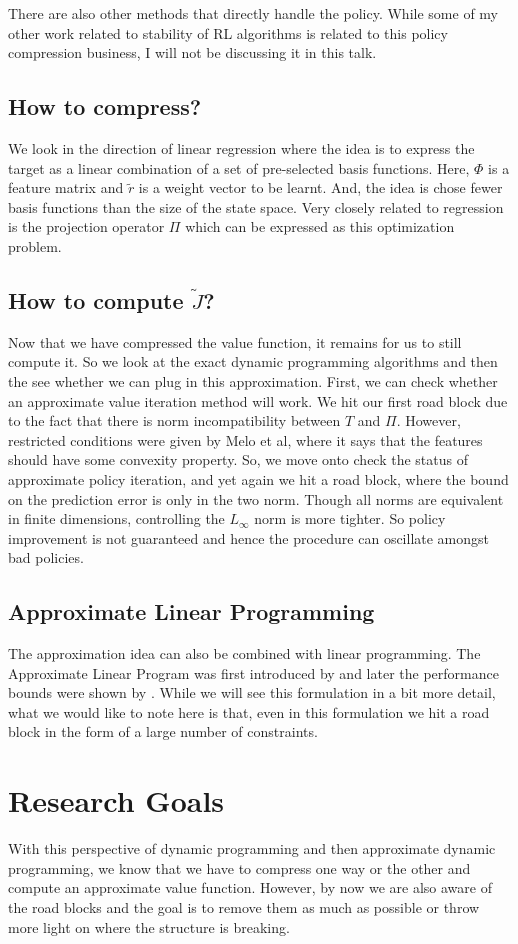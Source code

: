 \documentclass{article}
\newcommand{\tj}{\tilde{J}}
\begin{document}
There are also other methods that directly handle the policy. While some of my other work related to stability of RL algorithms is related to this policy compression business, I will not be discussing it in this talk.
\subsection{How to compress?}
We look in the direction of linear regression where the idea is to express the target as a linear combination of a set of pre-selected basis functions. Here, $\Phi$ is a feature matrix and $\tilde{r}$ is a weight vector to be learnt. And, the idea is chose fewer basis functions than the size of the state space. Very closely related to regression is the projection operator $\Pi$ which can be expressed as this optimization problem.
\subsection{How to compute $\tj$?}
Now that we have compressed the value function, it remains for us to still compute it. So we look at the exact dynamic programming algorithms and then the see whether we can plug in this approximation. First, we can check whether an approximate value iteration method will work. We hit our first road block due to the fact that there is norm incompatibility between $T$ and $\Pi$. However, restricted conditions were given by Melo et al, where it says that the features should have some convexity property. So, we move onto check the status of approximate policy iteration, and yet again we hit a road block, where the bound on the prediction error is only in the two norm. Though all norms are equivalent in finite dimensions, controlling the $L_\infty$ norm is more tighter. So policy improvement is not guaranteed and hence the procedure can oscillate amongst bad policies.
\subsection{Approximate Linear Programming}
The approximation idea can also be combined with linear programming. The Approximate Linear Program was first introduced by \cite{schweitzer1985generalized} and later the performance bounds were shown by \cite{de2003linear}. While we will see this formulation in a bit more detail, what we would like to note here is that, even in this formulation we hit a road block in the form of a large number of constraints.
\section{Research Goals}
With this perspective of dynamic programming and then approximate dynamic programming, we know that we have to compress one way or the other and compute an approximate value function. However, by now we are also aware of the road blocks and the goal is to remove them as much as possible or throw more light on where the structure is breaking.
\end{document}
